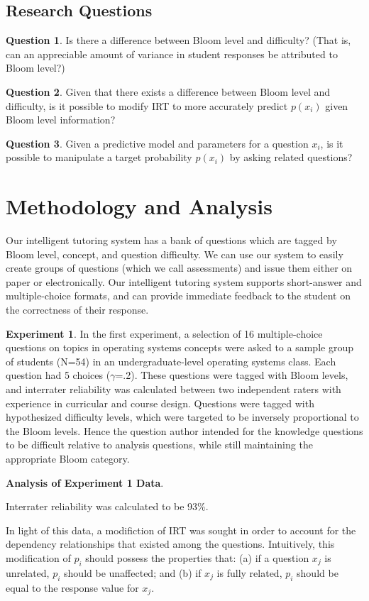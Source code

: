 \documentclass[a4paper,twocolumn]{article}
\begin{document}
\subsection{Research Questions}

\textbf{Question 1}. Is there a difference between Bloom level and difficulty?
(That is, can an appreciable amount of variance in student responses be
attributed to Bloom level?)

\textbf{Question 2}. Given that there exists a difference between Bloom level
and difficulty, is it possible to modify IRT to more accurately predict
$p(x_i)$ given Bloom level information?

\textbf{Question 3}. Given a predictive model and parameters for a question
$x_i$, is it possible to manipulate a target probability $p(x_i)$ by asking
related questions?


\section{Methodology and Analysis}

Our intelligent tutoring system has a bank of questions which are tagged by
Bloom level, concept, and question difficulty.  We can use our system to easily
create groups of questions (which we call assessments) and issue them either on
paper or electronically.  Our intelligent tutoring system supports short-answer
and multiple-choice formats, and can provide immediate feedback to the student
on the correctness of their response.


\textbf{Experiment 1}. In the first experiment, a selection of 16
multiple-choice questions on topics in operating systems concepts were asked to
a sample group of students (N=54) in an undergraduate-level operating systems
class.  Each question had 5 choices ($\gamma$=.2). These questions were tagged
with Bloom levels, and interrater reliability was calculated between two
independent raters with experience in curricular and course design.  Questions
were tagged with hypothesized difficulty levels, which were targeted to be
inversely proportional to the Bloom levels.  Hence the question author intended
for the knowledge questions to be difficult relative to analysis questions,
while still maintaining the appropriate Bloom category.


\textbf{Analysis of Experiment 1 Data}.  

Interrater reliability was calculated to be 93\%. 

In light of this data, a modifiction of IRT was sought in order to account for
the dependency relationships that existed among the questions.  Intuitively,
this modification of $p_i$ should possess the properties that: (a) if a
question $x_j$ is unrelated, $p_i$ should be unaffected; and (b) if $x_j$ is
fully related, $p_i$ should be equal to the response value for $x_j$. 
\end{document}
